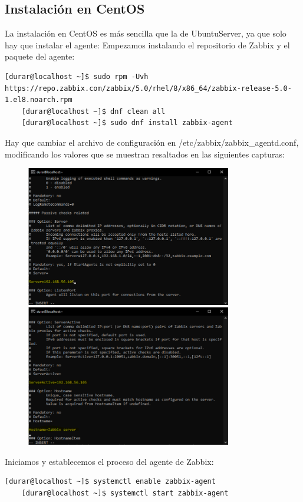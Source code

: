 \documentclass[a4paper]{article}
\begin{document}
\subsection*{Instalación en CentOS}
La instalación en CentOS es más sencilla que la de UbuntuServer, ya que solo hay que instalar 
el agente: \newline
Empezamos instalando el repositorio de Zabbix y el paquete del agente: 
\begin{lstlisting}[style=bashCentOS]
    [durar@localhost ~]$ sudo rpm -Uvh https://repo.zabbix.com/zabbix/5.0/rhel/8/x86_64/zabbix-release-5.0-1.el8.noarch.rpm
    [durar@localhost ~]$ dnf clean all
    [durar@localhost ~]$ sudo dnf install zabbix-agent
\end{lstlisting}
Hay que cambiar el archivo de configuración en /etc/zabbix/zabbix\_agentd.conf, modificando los valores 
que se muestran resaltados en las siguientes capturas:
\newpage
\begin{figure}
    \centering
    \includegraphics[width=0.8\textwidth]{cambiandoConfZabbigAgent1.png}
    \includegraphics[width=0.8\textwidth]{cambiandoConfZabbigAgent2.png}
\end{figure}
Iniciamos y establecemos el proceso del agente de Zabbix:
\begin{lstlisting}[style=bashCentOS]
    [durar@localhost ~]$ systemctl enable zabbix-agent
    [durar@localhost ~]$ systemctl start zabbix-agent
\end{lstlisting}
\end{document}
